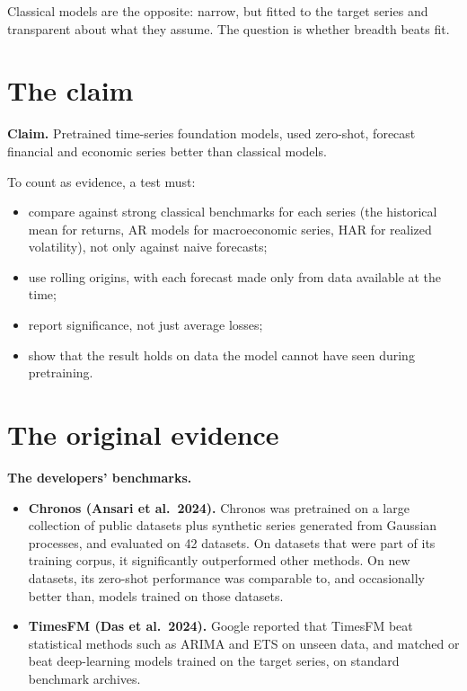 Classical models are the opposite: narrow, but fitted to the target series and transparent about what they assume. The question is whether breadth beats fit.

\section{The claim}
\label{sec:22-claim}

\begin{callout}
\textbf{Claim.} Pretrained time-series foundation models, used zero-shot, forecast financial and economic series better than classical models.
\end{callout}

To count as evidence, a test must:

\begin{itemize}
  \item compare against strong classical benchmarks for each series (the historical mean for returns, AR models for macroeconomic series, HAR for realized volatility), not only against naive forecasts;
  \item use rolling origins, with each forecast made only from data available at the time;
  \item report significance, not just average losses;
  \item show that the result holds on data the model cannot have seen during pretraining.
\end{itemize}

\section{The original evidence}
\label{sec:22-evidence}

\textbf{The developers' benchmarks.}

\begin{itemize}
  \item \textbf{Chronos (Ansari et al.\ 2024).} Chronos was pretrained on a large collection of public datasets plus synthetic series generated from Gaussian processes, and evaluated on 42 datasets. On datasets that were part of its training corpus, it significantly outperformed other methods. On new datasets, its zero-shot performance was comparable to, and occasionally better than, models trained on those datasets.
  \item \textbf{TimesFM (Das et al.\ 2024).} Google reported that TimesFM beat statistical methods such as ARIMA and ETS on unseen data, and matched or beat deep-learning models trained on the target series, on standard benchmark archives.
\end{itemize}

